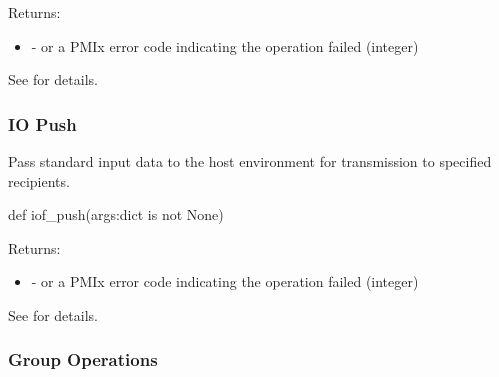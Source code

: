 Returns:
\begin{itemize}
    \item {} -  or a \ac{PMIx} error code indicating the operation failed (integer)
\end{itemize}

See  for details.


\subsubsection{IO Push}

\summary

Pass standard input data to the host environment for transmission to specified recipients.

\format

\pyspecificstart
\begin{codepar}
def iof_push(args:dict is not None)
\end{codepar}
\pyspecificend

\begin{arglist}
\end{arglist}

Returns:
\begin{itemize}
    \item {} -  or a \ac{PMIx} error code indicating the operation failed (integer)
\end{itemize}

See  for details.


\subsubsection{Group Operations}

